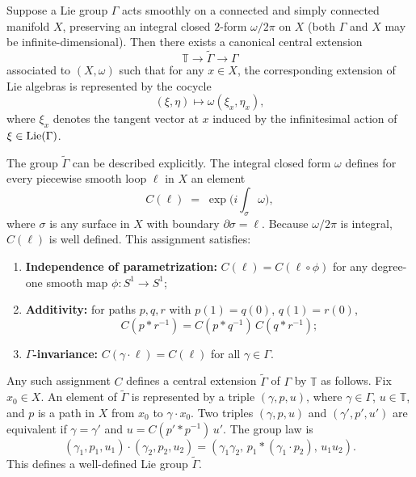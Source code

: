 \documentclass[12pt]{article}
\begin{document}
\begin{proposition}\label{prop:PS-4.4.2}
    Suppose a Lie group $\Gamma$ acts smoothly on a connected and simply connected manifold $X$, preserving an integral closed $2$-form $\omega/2\pi$ on $X$ (both $\Gamma$ and $X$ may be infinite-dimensional). Then there exists a canonical central extension
    \[
        \mathbb{T} \longrightarrow \widetilde{\Gamma} \longrightarrow \Gamma
    \]
    associated to $(X, \omega)$ such that for any $x\in X$, the corresponding extension of Lie algebras is represented by the cocycle
    \[
        (\xi,\eta) \longmapsto \omega(\xi_x,\eta_x),
    \]
    where $\xi_x$ denotes the tangent vector at $x$ induced by the infinitesimal action of $\xi\in\operatorname{Lie}(\Gamma)$.

    The group $\widetilde{\Gamma}$ can be described explicitly. The integral closed form $\omega$ defines for every piecewise smooth loop $\ell$ in $X$ an element
    \[
        C(\ell) \;=\; \exp\!\Big( i \int_\sigma \omega \Big),
    \]
    where $\sigma$ is any surface in $X$ with boundary $\partial\sigma = \ell$. Because $\omega/2\pi$ is integral, $C(\ell)$ is well defined. This assignment satisfies:
    \begin{enumerate}[label=({H\arabic*})]
        \item \textbf{Independence of parametrization:} $C(\ell) = C(\ell\circ\phi)$ for any degree-one smooth map $\phi:S^1\to S^1$;
        \item \textbf{Additivity:} for paths $p,q,r$ with $p(1)=q(0)$, $q(1)=r(0)$,
              \[
                  C(p*r^{-1}) = C(p*q^{-1})\,C(q*r^{-1});
              \]
        \item \textbf{$\Gamma$-invariance:} $C(\gamma\cdot\ell)=C(\ell)$ for all $\gamma\in\Gamma$.
    \end{enumerate}
    Any such assignment $C$ defines a central extension $\widetilde{\Gamma}$ of $\Gamma$ by $\mathbb{T}$ as follows. Fix $x_0\in X$. An element of $\widetilde{\Gamma}$ is represented by a triple $(\gamma,p,u)$, where $\gamma\in\Gamma$, $u\in\mathbb{T}$, and $p$ is a path in $X$ from $x_0$ to $\gamma\cdot x_0$. Two triples $(\gamma,p,u)$ and $(\gamma',p',u')$ are equivalent if $\gamma=\gamma'$ and $u = C(p'*p^{-1})\,u'$. The group law is
    \[
        (\gamma_1,p_1,u_1)\cdot(\gamma_2,p_2,u_2) = (\gamma_1\gamma_2,\, p_1 * (\gamma_1\cdot p_2),\, u_1u_2).
    \]
    This defines a well-defined Lie group $\widetilde{\Gamma}$.
\end{proposition}
\end{document}
